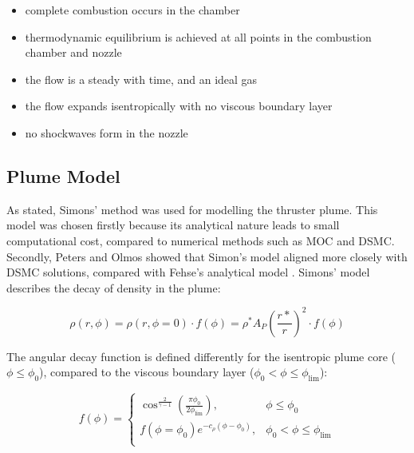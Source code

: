 \documentclass[journal]{new-aiaa}
\begin{document}
\begin{itemize}
    \item complete combustion occurs in the chamber
    \item thermodynamic equilibrium is achieved at all points in the combustion chamber and nozzle
    \item the flow is a steady with time, and an ideal gas
    \item the flow expands isentropically with no viscous boundary layer
    \item no shockwaves form in the nozzle
\end{itemize}



\subsection{Plume Model}

As stated, Simons' method was used for modelling the thruster plume. This model was chosen firstly because its analytical nature leads to small computational cost, compared to numerical methods such as MOC and DSMC. Secondly, Peters and Olmos showed that Simon's model aligned more closely with DSMC solutions, compared with Fehse's analytical model \cite{petersCOBRAContactlessDetumbling2016}. Simons' model describes the decay of density in the plume:


\begin{equation}
    \rho (r, \phi) = \rho (r, \phi=0) \cdot f(\phi) = \rho^* A_P \left( \frac{r*}{r} \right) ^{2} \cdot f(\phi)
    \label{method_eq_densitySimons}
\end{equation}

The angular decay function is defined differently for the isentropic plume core ($\phi \leq \phi_0$), compared to the viscous boundary layer ($\phi_0 < \phi \leq \phi_{\lim}$):

\begin{equation} 
f(\phi) =
\begin{cases} 
\cos^{\frac{2}{\gamma -1}} \left( \frac{\pi \phi_0}{2 \phi_{\lim}} \right), & \phi \leq \phi_0 \\
f(\phi=\phi_0) e^{-c_{\rho} (\phi - \phi_0)}, & \phi_0 < \phi \leq \phi_{\lim} \\
\end{cases}
\end{equation}

%
%
\end{document}
